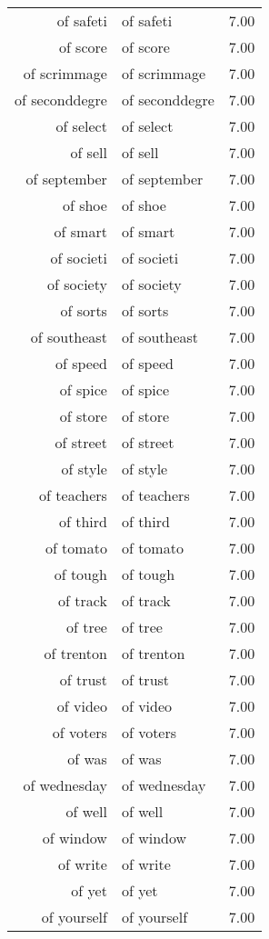 \begin{table}[ht]
\begin{tabular}{rlr}
  of safeti & of safeti & 7.00 \\ 
  of score & of score & 7.00 \\ 
  of scrimmage & of scrimmage & 7.00 \\ 
  of seconddegre & of seconddegre & 7.00 \\ 
  of select & of select & 7.00 \\ 
  of sell & of sell & 7.00 \\ 
  of september & of september & 7.00 \\ 
  of shoe & of shoe & 7.00 \\ 
  of smart & of smart & 7.00 \\ 
  of societi & of societi & 7.00 \\ 
  of society & of society & 7.00 \\ 
  of sorts & of sorts & 7.00 \\ 
  of southeast & of southeast & 7.00 \\ 
  of speed & of speed & 7.00 \\ 
  of spice & of spice & 7.00 \\ 
  of store & of store & 7.00 \\ 
  of street & of street & 7.00 \\ 
  of style & of style & 7.00 \\ 
  of teachers & of teachers & 7.00 \\ 
  of third & of third & 7.00 \\ 
  of tomato & of tomato & 7.00 \\ 
  of tough & of tough & 7.00 \\ 
  of track & of track & 7.00 \\ 
  of tree & of tree & 7.00 \\ 
  of trenton & of trenton & 7.00 \\ 
  of trust & of trust & 7.00 \\ 
  of video & of video & 7.00 \\ 
  of voters & of voters & 7.00 \\ 
  of was & of was & 7.00 \\ 
  of wednesday & of wednesday & 7.00 \\ 
  of well & of well & 7.00 \\ 
  of window & of window & 7.00 \\ 
  of write & of write & 7.00 \\ 
  of yet & of yet & 7.00 \\ 
  of yourself & of yourself & 7.00 \\ 

\end{tabular}
\end{table}
